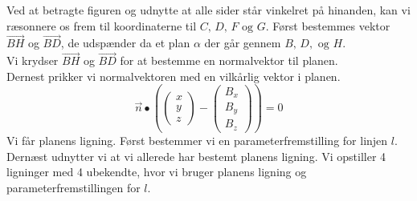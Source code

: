 \begin{tcolorbox}[title=Opgave 1,
    colback=blue!1!white,
    colframe=black,
    colbacktitle=blue!25!white,
    coltitle=red!25!black,
    fonttitle=\bfseries,
    subtitle style={boxrule=0.4pt,
    colback=blue!7!white} ]
        Ved at betragte figuren og udnytte at alle sider står vinkelret på hinanden, kan vi ræsonnere os frem til koordinaterne til \(C,\, D,\, F \text{ og } G\).
        Først bestemmes vektor \(\overrightarrow{BH}\) og \(\overrightarrow{BD}\), de udspænder da et plan \(\alpha\) der går gennem \(B,\, D,\text{ og } H\).\\
        Vi krydser \(\overrightarrow{BH}\) og \(\overrightarrow{BD}\) for at bestemme en normalvektor til planen.\\
        Dernest prikker vi normalvektoren med en vilkårlig vektor i planen.
        \[\overrightarrow{n}\bullet \left(\begin{pmatrix} x \\ y \\ z \end{pmatrix}-\begin{pmatrix}B_x \\B_y\\B_z \end{pmatrix}\right)=0\]
        Vi får planens ligning.
    Først bestemmer vi en parameterfremstilling for linjen \(l\).\\
    Dernæst udnytter vi at vi allerede har bestemt planens ligning. Vi opstiller 4 ligninger med 4 ubekendte, hvor vi bruger planens ligning og parameterfremstillingen for \(l\).
\end{tcolorbox}